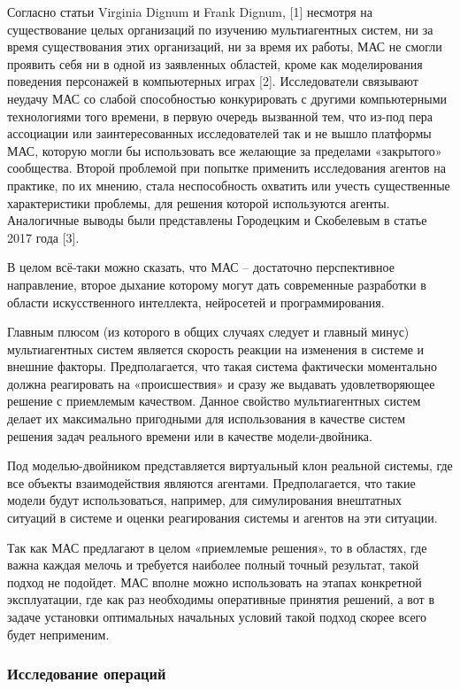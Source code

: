 Согласно статьи Virginia Dignum и Frank Dignum, [1] несмотря на существование целых организаций по изучению мультиагентных систем, ни за время существования этих организаций, ни за время их работы, МАС не смогли проявить себя ни в одной из заявленных областей, кроме как моделирования поведения персонажей в компьютерных играх [2]. Исследователи связывают неудачу МАС со слабой способностью конкурировать с другими компьютерными технологиями того времени, в первую очередь вызванной тем, что из-под пера ассоциации или заинтересованных исследователей так и не вышло платформы МАС, которую могли бы использовать все желающие за пределами «закрытого» сообщества. Второй проблемой при попытке применить исследования агентов на практике, по их мнению, стала неспособность охватить или учесть существенные характеристики проблемы, для решения которой используются агенты. Аналогичные выводы были представлены Городецким и Скобелевым в статье 2017 года [3].

В целом всё-таки можно сказать, что МАС – достаточно перспективное направление, второе дыхание которому могут дать современные разработки в области искусственного интеллекта, нейросетей и программирования.

Главным плюсом (из которого в общих случаях следует и главный минус) мультиагентных систем является скорость реакции на изменения в системе и внешние факторы. Предполагается, что такая система фактически моментально должна реагировать на «происшествия» и сразу же выдавать удовлетворяющее решение с приемлемым качеством. Данное свойство мультиагентных систем делает их максимально пригодными для использования в качестве систем решения задач реального времени или в качестве модели-двойника.

Под моделью-двойником представляется виртуальный клон реальной системы, где все объекты взаимодействия являются агентами. Предполагается, что такие модели будут использоваться, например, для симулирования внештатных ситуаций в системе и оценки реагирования системы и агентов на эти ситуации. 

Так как МАС предлагают в целом «приемлемые решения», то в областях, где важна каждая мелочь и требуется наиболее полный точный результат, такой подход не подойдет. МАС вполне можно использовать на этапах конкретной эксплуатации, где как раз необходимы оперативные принятия решений, а вот в задаче установки оптимальных начальных условий такой подход скорее всего будет неприменим.

\subsubsection{Исследование операций}


